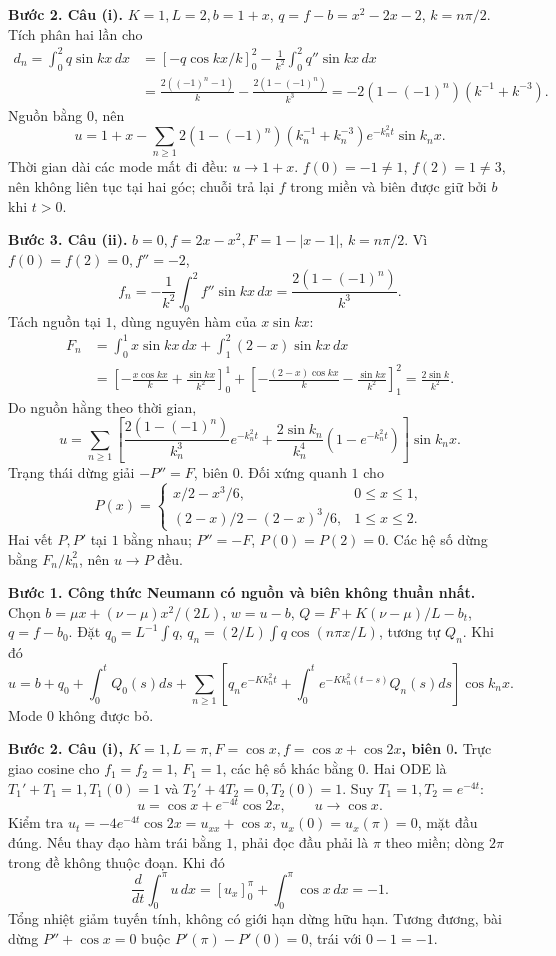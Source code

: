 \textbf{Bước 2. Câu (i).} $K=1,L=2,b=1+x$, $q=f-b=x^2-2x-2$, $k=n\pi/2$. Tích phân hai lần cho
\begin{align*}
d_n=\int_0^2q\sin kx\,dx
&=\left[-q\cos kx/k\right]_0^2-\frac1{k^2}\int_0^2q''\sin kx\,dx\\
&=\frac{2((-1)^n-1)}k-\frac{2(1-(-1)^n)}{k^3}
=-2(1-(-1)^n)(k^{-1}+k^{-3}).
\end{align*}
Nguồn bằng $0$, nên
\[u=1+x-\sum_{n\ge1}2(1-(-1)^n)(k_n^{-1}+k_n^{-3})e^{-k_n^2t}\sin k_nx.\]
Thời gian dài các mode mất đi đều: $u\to1+x$. $f(0)=-1\ne1$, $f(2)=1\ne3$, nên không liên tục tại hai góc; chuỗi trả lại $f$ trong miền và biên được giữ bởi $b$ khi $t>0$.

\textbf{Bước 3. Câu (ii).} $b=0,f=2x-x^2,F=1-|x-1|$, $k=n\pi/2$. Vì $f(0)=f(2)=0,f''=-2$,
\[f_n=-\frac1{k^2}\int_0^2f''\sin kx\,dx=\frac{2(1-(-1)^n)}{k^3}.\]
Tách nguồn tại $1$, dùng nguyên hàm của $x\sin kx$:
\begin{align*}
F_n&=\int_0^1x\sin kx\,dx+\int_1^2(2-x)\sin kx\,dx\\
&=\left[-\frac{x\cos kx}k+\frac{\sin kx}{k^2}\right]_0^1
+\left[-\frac{(2-x)\cos kx}k-\frac{\sin kx}{k^2}\right]_1^2
=\frac{2\sin k}{k^2}.
\end{align*}
Do nguồn hằng theo thời gian,
\[u=\sum_{n\ge1}\left[\frac{2(1-(-1)^n)}{k_n^3}e^{-k_n^2t}
+\frac{2\sin k_n}{k_n^4}(1-e^{-k_n^2t})\right]\sin k_nx.\]
Trạng thái dừng giải $-P''=F$, biên $0$. Đối xứng quanh $1$ cho
\[P(x)=\begin{cases}x/2-x^3/6,&0\le x\le1,\\(2-x)/2-(2-x)^3/6,&1\le x\le2.\end{cases}\]
Hai vết $P,P'$ tại $1$ bằng nhau; $P''=-F$, $P(0)=P(2)=0$. Các hệ số dừng bằng $F_n/k_n^2$, nên $u\to P$ đều.

\textbf{Bước 1. Công thức Neumann có nguồn và biên không thuần nhất.}
Chọn $b=\mu x+(\nu-\mu)x^2/(2L)$, $w=u-b$, $Q=F+K(\nu-\mu)/L-b_t$, $q=f-b_0$. Đặt $q_0=L^{-1}\int q$, $q_n=(2/L)\int q\cos(n\pi x/L)$, tương tự $Q_n$. Khi đó
\[u=b+q_0+\int_0^tQ_0(s)ds+
\sum_{n\ge1}\left[q_ne^{-Kk_n^2t}+
\int_0^te^{-Kk_n^2(t-s)}Q_n(s)ds\right]\cos k_nx.\]
Mode $0$ không được bỏ.

\textbf{Bước 2. Câu (i), $K=1,L=\pi,F=\cos x,f=\cos x+\cos2x$, biên $0$.}
Trực giao cosine cho $f_1=f_2=1$, $F_1=1$, các hệ số khác bằng $0$. Hai ODE là $T_1'+T_1=1,T_1(0)=1$ và $T_2'+4T_2=0,T_2(0)=1$. Suy $T_1=1,T_2=e^{-4t}$:
\[u=\cos x+e^{-4t}\cos2x,\qquad u\to\cos x.\]
Kiểm tra $u_t=-4e^{-4t}\cos2x=u_{xx}+\cos x$, $u_x(0)=u_x(\pi)=0$, mặt đầu đúng.
Nếu thay đạo hàm trái bằng $1$, phải đọc đầu phải là $\pi$ theo miền; dòng $2\pi$ trong đề không thuộc đoạn. Khi đó
\[\frac d{dt}\int_0^\pi u\,dx=[u_x]_0^\pi+\int_0^\pi\cos x\,dx=-1.\]
Tổng nhiệt giảm tuyến tính, không có giới hạn dừng hữu hạn. Tương đương, bài dừng $P''+\cos x=0$ buộc $P'(\pi)-P'(0)=0$, trái với $0-1=-1$.

